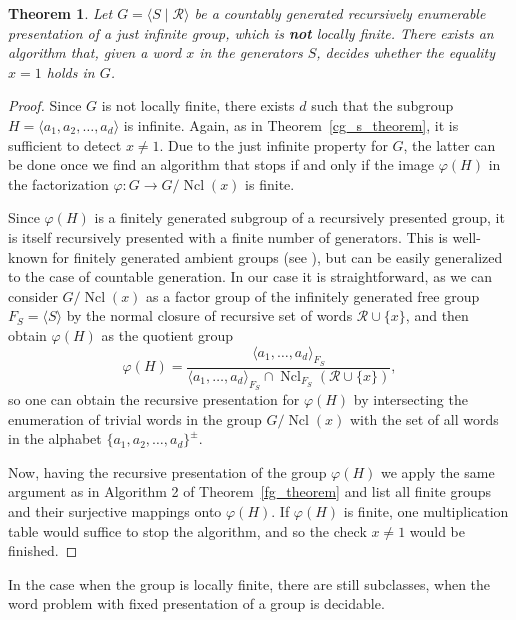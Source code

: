 \documentclass[12pt,a4paper]{amsart}
\newtheorem{theorem}{Theorem}
\DeclareMathOperator{\Ncl}{Ncl}
\begin{document}
\begin{theorem}
\label{cg_jinlf_theorem}
    Let $G=\langle S \mid \mathcal{R} \rangle$ be a countably generated recursively enumerable presentation of a just infinite group, which is \textbf{not} locally finite. There exists an algorithm that, given a word $x$ in the generators $S$, decides whether the equality $x=1$ holds in $G$.
\end{theorem}
\begin{proof}
Since $G$ is not locally finite, there exists $d$ such that the subgroup $H=\langle a_1,a_2,\ldots,a_d\rangle$ is infinite. Again, as in Theorem~\ref{cg_s_theorem}, it is sufficient to detect $x\ne 1$. Due to the just infinite property for $G$, the latter can be done once we find an algorithm that stops if and only if the image $\varphi(H)$ in the factorization $\varphi: G\to G/\Ncl(x)$ is finite.

Since $\varphi(H)$ is a finitely generated subgroup of a recursively presented group, it is itself recursively presented with a finite number of generators. This is well-known for finitely generated ambient groups (see \cite[Lemma 2.1]{Miller}), but can be easily generalized to the case of countable generation. In our case it is straightforward, as we can consider $G/\Ncl(x)$ as a factor group of the infinitely generated free group $F_S=\langle S \rangle$ by the normal closure of recursive set of words $\mathcal R\cup\{x\}$, and then obtain $\varphi(H)$ as the quotient group
\[
\varphi(H)=\frac{\langle a_1,\ldots,a_d\rangle_{F_S}}{\langle a_1,\ldots,a_d\rangle_{F_S}\cap\Ncl_{F_S}(\mathcal R\cup\{x\})},
\]
so one can obtain the recursive presentation for $\varphi(H)$ by intersecting the enumeration of trivial words in the group $G/\Ncl(x)$ with the set of all words in the alphabet $\{a_1,a_2,\ldots,a_d\}^{\pm}$.

Now, having the recursive presentation of the group $\varphi(H)$ we apply the same argument as in Algorithm 2 of Theorem~\ref{fg_theorem} and list all finite groups and their surjective mappings onto $\varphi(H)$. If $\varphi(H)$ is finite, one multiplication table would suffice to stop the algorithm, and so the check $x \ne 1$ would be finished.
\end{proof}

In the case when the group is locally finite, there are still subclasses, when the word problem with fixed presentation of a group is decidable.
\end{document}
